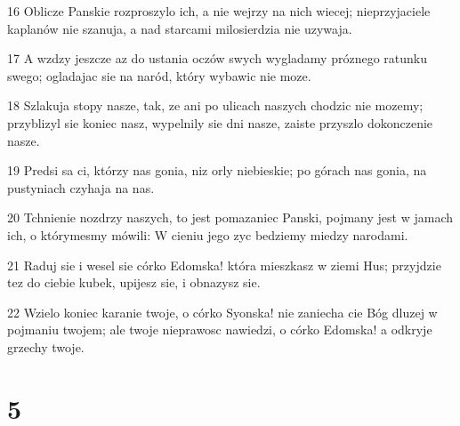 \par 16 Oblicze Panskie rozproszylo ich, a nie wejrzy na nich wiecej; nieprzyjaciele kaplanów nie szanuja, a nad starcami milosierdzia nie uzywaja.
\par 17 A wzdzy jeszcze az do ustania oczów swych wygladamy próznego ratunku swego; ogladajac sie na naród, który wybawic nie moze.
\par 18 Szlakuja stopy nasze, tak, ze ani po ulicach naszych chodzic nie mozemy; przyblizyl sie koniec nasz, wypelnily sie dni nasze, zaiste przyszlo dokonczenie nasze.
\par 19 Predsi sa ci, którzy nas gonia, niz orly niebieskie; po górach nas gonia, na pustyniach czyhaja na nas.
\par 20 Tchnienie nozdrzy naszych, to jest pomazaniec Panski, pojmany jest w jamach ich, o którymesmy mówili: W cieniu jego zyc bedziemy miedzy narodami.
\par 21 Raduj sie i wesel sie córko Edomska! która mieszkasz w ziemi Hus; przyjdzie tez do ciebie kubek, upijesz sie, i obnazysz sie.
\par 22 Wzielo koniec karanie twoje, o córko Syonska! nie zaniecha cie Bóg dluzej w pojmaniu twojem; ale twoje nieprawosc nawiedzi, o córko Edomska! a odkryje grzechy twoje.

\chapter{5}

